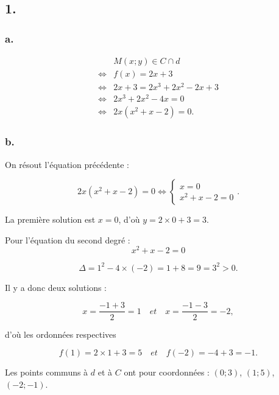 \subsection*{1.}
	
	\subsubsection*{a.}
	
	\begin{align*}
&M(x ; y) \in C \cap d \\
\iff& f(x)=2x+3\\
\iff&  2x + 3 = 2x^3 + 2x^2 - 2x + 3 \\
\iff& 2x^3 + 2x^2 - 4x = 0 \\
\iff& 2x (x^2 + x - 2) = 0.
	\end{align*}
	
	\subsubsection*{b.}
	
	On résout l’équation précédente :
	
	\[
	2x (x^2 + x - 2) =0 \iff
	\begin{cases}
		x = 0 \\
		x^2 + x - 2 = 0
	\end{cases}.
	\]
	
	La première solution est \(x = 0\), d’où \(y = 2 \times 0 + 3 = 3\).
	
	Pour l’équation du second degré :
	\[
	x^2 + x - 2 = 0
	\]
	
	\[
	\Delta = 1^2 - 4 \times (-2) = 1 + 8 = 9 = 3^2 > 0.
	\]
	
	Il y a donc deux solutions :
	
	\[
	x = \dfrac{-1 + 3}{2} = 1 \quad et \quad x = \dfrac{-1 - 3}{2} = -2,
	\]
	
	d’où les ordonnées respectives
	
	\[
	f(1) = 2 \times 1 + 3 = 5 \quad et \quad f(-2) = -4 + 3 = -1.
	\]
	
	Les points communs à \(d\) et à \(C\) ont pour coordonnées : 	\((0 ; 3)\), \((1 ; 5)\), \((-2 ; -1)\).
	
